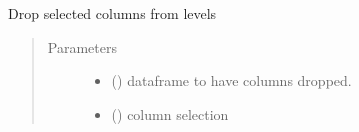 \documentclass[letterpaper,10pt,english]{sphinxmanual}
\begin{document}
\begin{fulllineitems}
\label{\detokenize{dalio.util:dalio.util.level_utils.drop_cols}}
Drop selected columns from levels
\begin{quote}\begin{description}
\item[{Parameters}] \leavevmode\begin{itemize}
\item {} 
 () \textendash{} dataframe to have columns dropped.

\item {} 
 (\sphinxstyleliteralemphasis{\sphinxupquote{, }}\sphinxstyleliteralemphasis{\sphinxupquote{, }}) \textendash{} column selection

\end{itemize}

\end{description}\end{quote}

\end{fulllineitems}

\end{document}
